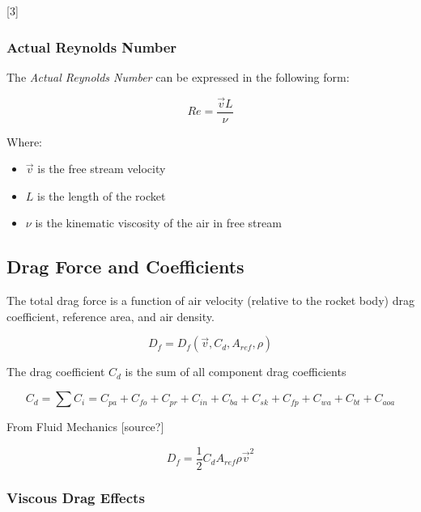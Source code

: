 \documentclass[]{article}
\providecommand{\tightlist}{%
  \setlength{\itemsep}{0pt}\setlength{\parskip}{0pt}}
\begin{document}
{[}3{]}

\subsubsection{Actual Reynolds Number}\label{actual-reynolds-number}

The \emph{Actual Reynolds Number} can be expressed in the following
form:

\begin{equation}
Re = \dfrac{\vec{v} L}{\nu} 
\end{equation}

Where:

\begin{itemize}
\tightlist
\item
  \(\vec{v}\) is the free stream velocity
\item
  \(L\) is the length of the rocket
\item
  \(\nu\) is the kinematic viscosity of the air in free stream
\end{itemize}

\subsection{Drag Force and
Coefficients}\label{drag-force-and-coefficients}

The total drag force is a function of air velocity (relative to the
rocket body) drag coefficient, reference area, and air density.

\begin{equation} 
D_f = D_f (\vec{v}, C_d, A_{ref}, \rho) 
\end{equation}

The drag coefficient \(C_d\) is the sum of all component drag
coefficients

\begin{equation} 
C_d = \sum C_i = C_{pa} + C_{fo} + C_{pr} + C_{in} + C_{ba} + C_{sk} + C_{fp} + C_{wa} + C_{bt} + C_{aoa}
\end{equation}

From Fluid Mechanics {[}source?{]}

\begin{equation}
D_f = \dfrac{1}{2} C_d A_{ref} \rho \vec{v}^2  
\end{equation}

\subsubsection{Viscous Drag Effects}\label{viscous-drag-effects}
\end{document}
